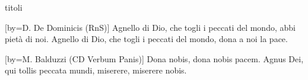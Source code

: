 \begin{songs}{titoli}

[by={D. De Dominicis (RnS)}]
\beginverse*
Agnello di Dio, che togli i peccati del mondo,
abbi pietà di noi. 
Agnello di Dio, che togli i peccati del mondo,
dona a noi la pace.
\endverse
\endsong

[by={M. Balduzzi (CD Verbum Panis)}]
\beginchorus
Dona nobis, dona nobis pacem.
\endchorus
\beginverse*
Agnus Dei, qui tollis peccata mundi,
miserere, miserere nobis. 
\endverse
\endsong

\end{songs}
